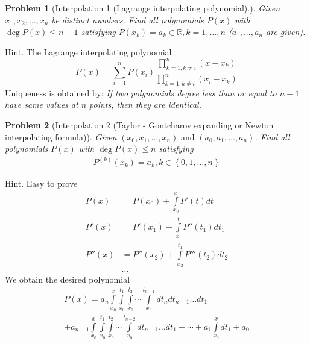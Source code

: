 \documentclass{article}
\newtheorem{problem}{Problem}
\begin{document}
\begin{problem}[Interpolation 1 (Lagrange interpolating polynomial).]
	Given ${x_1},{x_2}, \ldots ,{x_n}$ be distinct numbers. Find all polynomials $P(x)$ with $\deg P(x) \le n-1$ satisfying $P(x_k)=a_k \in \mathbb{R}, k=1,...,n$ ($a_1,...,a_n$ are given).
\end{problem}
{\sf Hint.} The Lagrange interpolating polynomial
\begin{equation}
	P\left( x \right) = \sum\limits_{i = 1}^n {P\left( {{x_i}} \right)\frac{{\prod\limits_{k = 1,k \ne i}^n {\left( {x - {x_k}} \right)} }}{{\prod\limits_{k = 1,k \ne i}^n {\left( {{x_i} - {x_k}} \right)} }}}
\end{equation}
Uniqueness is obtained by: \textit{If two polynomials degree less than or equal to $n-1$ have same values at $n$ points, then they are identical.}

\begin{problem}[Interpolation 2 (Taylor - Gontcharov expanding or Newton interpolating formula)]
	Given $\left( {{x_0},{x_1}, \ldots ,{x_n}} \right)\mbox{ and }\left( {{a_0},{a_1}, \ldots ,{a_n}} \right)$. Find all polynomials $P(x)$ with $\deg P(x) \le n$ satisfying
	\begin{align}
		{P^{\left( k \right)}}\left( {{x_k}} \right) = {a_k},k \in \left\{ {0,1, \ldots ,n} \right\}
	\end{align}
\end{problem}
{\sf Hint.}
Easy to prove
\begin{align}
	P\left( x \right) &= P\left( {{x_0}} \right) + \int\limits_{{x_0}}^x {P'\left( t \right)} dt\\
	P'\left( x \right) &= P'\left( {{x_1}} \right) + \int\limits_{{x_1}}^t {P''\left( {{t_1}} \right)} d{t_1}\\
	P''\left( x \right) &= P''\left( {{x_2}} \right) + \int\limits_{{x_2}}^{{t_1}} {P'''\left( {{t_2}} \right)} d{t_2}\\
	&\hdots
\end{align}
We obtain the desired polynomial
\begin{align}
	P\left( x \right) = {a_n}\int\limits_{{x_0}}^x {\int\limits_{{x_0}}^{{t_1}} {\int\limits_{{x_0}}^{{t_2}} { \cdots \int\limits_{{x_0}}^{{t_{n - 1}}} {d{t_n}d{t_{n - 1}} \ldots d{t_1}} } } } \\
	+ {a_{n - 1}}\int\limits_{{x_0}}^x {\int\limits_{{x_0}}^{{t_1}} {\int\limits_{{x_0}}^{{t_2}} { \cdots \int\limits_{{x_0}}^{{t_{n - 2}}} {d{t_{n - 1}} \ldots d{t_1}} }  +  \cdots  + {a_1}\int\limits_{{x_0}}^x {d{t_1}} }  + {a_0}} 
\end{align}
\end{document}
